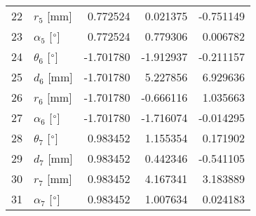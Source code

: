 \documentclass{standalone}%
\begin{document}
\begin{tabular}{llrrr}
22 &              $r_{5}$ [mm] &  0.772524 &   0.021375 &  -0.751149 \\
23 &  $\alpha_{5}$ [$\degree$] &  0.772524 &   0.779306 &   0.006782 \\
24 &  $\theta_{6}$ [$\degree$] & -1.701780 &  -1.912937 &  -0.211157 \\
25 &              $d_{6}$ [mm] & -1.701780 &   5.227856 &   6.929636 \\
26 &              $r_{6}$ [mm] & -1.701780 &  -0.666116 &   1.035663 \\
27 &  $\alpha_{6}$ [$\degree$] & -1.701780 &  -1.716074 &  -0.014295 \\
28 &  $\theta_{7}$ [$\degree$] &  0.983452 &   1.155354 &   0.171902 \\
29 &              $d_{7}$ [mm] &  0.983452 &   0.442346 &  -0.541105 \\
30 &              $r_{7}$ [mm] &  0.983452 &   4.167341 &   3.183889 \\
31 &  $\alpha_{7}$ [$\degree$] &  0.983452 &   1.007634 &   0.024183 \\
\bottomrule
\end{tabular}
%
\end{document}
